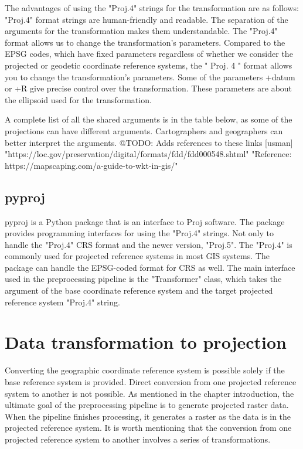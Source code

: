 The advantages of using the "Proj.4" strings for the transformation are as follows:
"Proj.4" format strings are human-friendly and readable. The separation of the arguments for the transformation makes them understandable.
The "Proj.4" format allows us to change the transformation's parameters. Compared to the EPSG codes, which have fixed parameters regardless of whether we consider the projected or geodetic coordinate reference systems, the " Proj. 4 " format allows you to change the transformation's parameters.
Some of the parameters +datum or +R give precise control over the transformation. These parameters are about the ellipsoid used for the transformation.

A complete list of all the shared arguments is in the table below, as some of the projections can have different arguments. Cartographers and geographers can better interpret the arguments.
@TODO: Adds references to these links [usman]
"https://loc.gov/preservation/digital/formats/fdd/fdd000548.shtml"
"Reference: https://mapscaping.com/a-guide-to-wkt-in-gis/"
\subsection{pyproj}
pyproj is a Python package that is an interface to Proj software. The package provides programming interfaces for using the "Proj.4" strings. Not only to handle the "Proj.4"  CRS format and the newer version, "Proj.5". The "Proj.4" is commonly used for projected reference systems in most GIS systems. The package can handle the EPSG-coded format for CRS as well. The main interface used in the preprocessing pipeline is the "Transformer" class, which takes the argument of the base coordinate reference system and the target projected reference system "Proj.4" string.

\section{Data transformation to projection}
Converting the geographic coordinate reference system is possible solely if the base reference system is provided. Direct conversion from one projected reference system to another is not possible. As mentioned in the chapter introduction, the ultimate goal of the preprocessing pipeline is to generate projected raster data. When the pipeline finishes processing, it generates a raster as the data is in the projected reference system.
It is worth mentioning that the conversion from one projected reference system to another involves a series of transformations.

